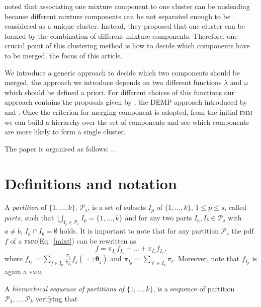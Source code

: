 \documentclass[10pt, a4paper]{article}
\newcommand{\m}[1]{\boldsymbol{#1}}
\newcommand{\fmm}{\textsc{fmm}\xspace}
\begin{document}
\begin{spacing}{1.9}
\cite{lee2004combining,hennig2010methods,baudry2010combining,melnykov2013distribution,pastore2013merging} noted that associating one mixture component to one cluster can be misleading because different mixture components can be not separated enough to be considered as a unique cluster. Instead, they proposed that one cluster can be formed by the combination of different mixture components. Therefore, one crucial point of this clustering method is how to decide which components have to be merged, the focus of this article.


We introduce a generic approach to decide which two components should be merged, the approach we introduce depends on two different functions $\lambda$ and $\omega$ which should be defined a priori. For different choices of this functions our approach contains the proposals given by \cite{baudry2010combining}, the DEMP approach introduced by \cite{hennig2010methods} and \cite{longford2014}. Once the criterion for merging component is adopted, from the initial \fmm we can build a hierarchy over the set of components and see which components are more likely to form a single cluster.

The paper is organised as follows: $\dots$


\section{Definitions and notation}

%


A \emph{partition} of $\{1, \dots, k\}$, $\mathcal{P}_s$,  is a set of subsets $I_p$ of $\{1, \dots, k\}$, $1\leq p \leq s$, called $parts$, such that $\bigcup_{I_p \in \mathcal{P}_s} I_p = \{1, \dots, k\}$ and for any two parts $I_a, I_b \in \mathcal{P}_s$ with $a \neq b$, $I_a \cap I_b = \emptyset$ holds. It is important to note that for any partition  $\mathcal{P}_s$ the pdf $f$ of a \fmm (Eq.~\ref{mixt}) can be rewritten as
\begin{equation}
f = \pi_{I_1} f_{I_1} + \dots + \pi_{I_s} f_{I_s},
\label{mixt_part}
\end{equation}
where $f_{I_p} = \sum_{j \in I_p} \frac{\pi_j}{\pi_{I_p}} f_j(\;\cdot\; ; \m\theta_j)$ and $\pi_{I_p} = \sum_{\ell \in I_p} \pi_\ell$. Moreover, note that $f_{I_p}$ is again a \fmm.



A \emph{hierarchical sequence of partitions of $\{1,...,k\}$}, is a sequence of partition $\mathcal{P}_1, \dots, \mathcal{P}_k$ verifying that
  

\end{spacing}
\end{document}
